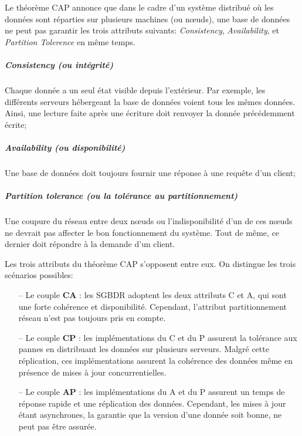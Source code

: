 		Le théorème CAP annonce que dans le cadre d'un système distribué où les données sont réparties sur plusieurs machines (ou n\oe{}uds),
		une base de données ne peut pas garantir les trois attributs suivants: \textit{Consistency}, \textit{Availability}, et \textit{Partition Tolerence}  en même temps. 
		
		
			\subparagraph{ Consistency (ou intégrité)} Chaque donnée a un seul état visible depuis l'extérieur. Par exemple, les différents serveurs hébergeant la base de données voient tous les mêmes données. Ainsi, une lecture faite après une écriture doit renvoyer la donnée précédemment écrite;
			
			\subparagraph{ Availability (ou disponibilité)} Une base de données doit toujours fournir une réponse à une requête d'un client; 
			
			
			 \subparagraph{Partition tolerance (ou la tolérance au partitionnement) } Une coupure du réseau entre deux n\oe{}uds ou l'indisponibilité d'un de ces n\oe{}uds ne devrait pas affecter le bon fonctionnement du système. Tout de même,  ce dernier doit répondre à la demande d'un client. 

		
		Les trois attributs du théorème CAP s'opposent entre eux. On distingue les trois scénarios possibles:
		
		\begin{itemize}
			\item [--] Le couple \textbf{CA} : les SGBDR adoptent les deux attributs C et A, qui sont une forte cohérence et disponibilité. Cependant, l'attribut partitionnement réseau n'est pas toujours pris en compte.
			\item [--] Le couple \textbf{CP} : les implémentations du C et du P assurent la tolérance aux pannes en distribuant les données sur plusieurs serveurs. Malgré cette réplication, ces implémentations assurent la cohérence des données même en présence de mises à jour concurrentielles.
			\item [--] Le couple \textbf{AP} : les implémentations du A et du  P assurent un temps de réponse rapide et une réplication des données. Cependant, les mises à jour étant asynchrones, la garantie que la version d'une donnée soit bonne, ne peut pas être assurée.
			
		\end{itemize}
		
